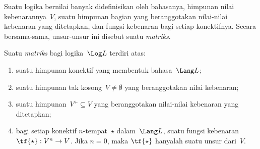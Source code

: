 \documentclass[../../../include/open-logic-section]{subfiles}
\begin{document}


Suatu logika bernilai banyak didefinisikan oleh bahasanya, himpunan nilai
kebenarannya~$V$, suatu himpunan bagian yang beranggotakan nilai-nilai
kebenaran yang ditetapkan, dan fungsi kebenaran bagi setiap konektifnya.
Secara bersama-sama, unsur-unsur ini disebut suatu \emph{matriks}.

\begin{defn}[Matriks]
Suatu \emph{matriks} bagi logika~$\Log L$ terdiri atas:
\begin{enumerate}
\item suatu himpunan konektif yang membentuk bahasa~$\Lang L$;
\item suatu himpunan tak kosong~$V\neq\emptyset$ yang beranggotakan nilai
kebenaran;
\item suatu himpunan~$V^+\subseteq V$ yang beranggotakan nilai-nilai
kebenaran yang ditetapkan;
\item bagi setiap konektif $n$-tempat~$\star$ dalam~$\Lang L$, suatu fungsi
kebenaran~$\tf{\star}:V^n\to V$. Jika $n=0$, maka $\tf{\star}$ hanyalah
suatu unsur dari~$V$.
\end{enumerate}
\end{defn}
\end{document}
